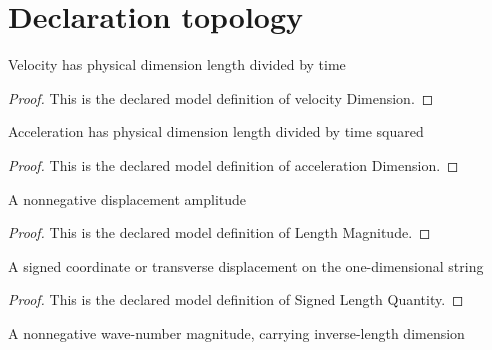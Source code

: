 \section{Declaration topology}
\begin{definition}
  \label{def:physics:phyx-mini-0288:phyxminiproblems-problemphyxmini0288-velocitydimension}
  Velocity has physical dimension length divided by time
\end{definition}
\begin{proof}
  This is the declared model definition of velocity Dimension.
\end{proof}
\begin{definition}
  \label{def:physics:phyx-mini-0288:phyxminiproblems-problemphyxmini0288-accelerationdimension}
  Acceleration has physical dimension length divided by time squared
\end{definition}
\begin{proof}
  This is the declared model definition of acceleration Dimension.
\end{proof}
\begin{definition}
  \label{def:physics:phyx-mini-0288:phyxminiproblems-problemphyxmini0288-lengthmagnitude}
  A nonnegative displacement amplitude
\end{definition}
\begin{proof}
  This is the declared model definition of Length Magnitude.
\end{proof}
\begin{definition}
  \label{def:physics:phyx-mini-0288:phyxminiproblems-problemphyxmini0288-signedlengthquantity}
  A signed coordinate or transverse displacement on the one-dimensional string
\end{definition}
\begin{proof}
  This is the declared model definition of Signed Length Quantity.
\end{proof}
\begin{definition}
  \label{def:physics:phyx-mini-0288:phyxminiproblems-problemphyxmini0288-wavenumbermagnitude}
  A nonnegative wave-number magnitude, carrying inverse-length dimension
\end{definition}
